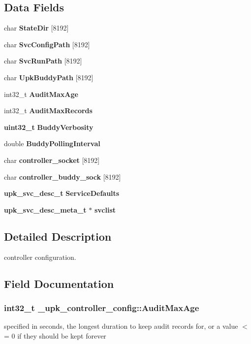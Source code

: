\subsection*{Data Fields}
\begin{DoxyCompactItemize}
\item 
char {\bf StateDir} [8192]
\item 
char {\bf SvcConfigPath} [8192]
\item 
char {\bf SvcRunPath} [8192]
\item 
char {\bf UpkBuddyPath} [8192]
\item 
int32\_\-t {\bf AuditMaxAge}
\item 
int32\_\-t {\bf AuditMaxRecords}
\item 
{\bf uint32\_\-t} {\bf BuddyVerbosity}
\item 
double {\bf BuddyPollingInterval}
\item 
char {\bf controller\_\-socket} [8192]
\item 
char {\bf controller\_\-buddy\_\-sock} [8192]
\item 
{\bf upk\_\-svc\_\-desc\_\-t} {\bf ServiceDefaults}
\item 
{\bf upk\_\-svc\_\-desc\_\-meta\_\-t} $\ast$ {\bf svclist}
\end{DoxyCompactItemize}


\subsection{Detailed Description}
controller configuration. 

\subsection{Field Documentation}
\subsubsection[{AuditMaxAge}]{\setlength{\rightskip}{0pt plus 5cm}int32\_\-t {\bf \_\-upk\_\-controller\_\-config::AuditMaxAge}}\label{struct__upk__controller__config_a90f914caf4184f50f8f2679ed92eb78f}
specified in seconds, the longest duration to keep audit records for, or a value $<$= 0 if they should be kept forever 
